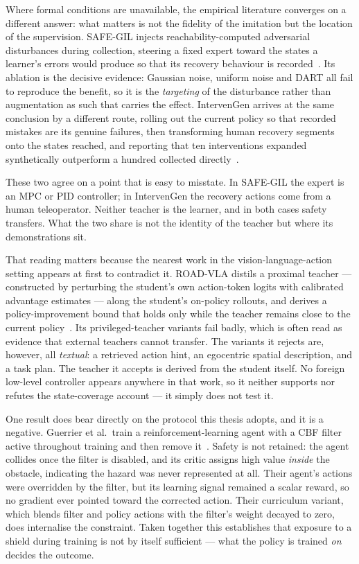 \documentclass[a4paper,11pt]{report}
\begin{document}
Where formal conditions are unavailable, the empirical literature converges on a different answer:
what matters is not the fidelity of the imitation but the location of the supervision. SAFE-GIL
injects reachability-computed adversarial disturbances during collection, steering a fixed expert
toward the states a learner's errors would produce so that its recovery behaviour is
recorded~\cite{ciftci2025safegil}. Its ablation is the decisive evidence: Gaussian noise, uniform
noise and DART all fail to reproduce the benefit, so it is the \emph{targeting} of the disturbance
rather than augmentation as such that carries the effect. IntervenGen arrives at the same
conclusion by a different route, rolling out the current policy so that recorded mistakes are its
genuine failures, then transforming human recovery segments onto the states reached, and reporting
that ten interventions expanded synthetically outperform a hundred collected
directly~\cite{hoque2024intervengen}.

These two agree on a point that is easy to misstate. In SAFE-GIL the expert is an MPC or PID
controller; in IntervenGen the recovery actions come from a human teleoperator. Neither teacher is
the learner, and in both cases safety transfers. What the two share is not the identity of the
teacher but where its demonstrations sit.

That reading matters because the nearest work in the vision-language-action setting appears at
first to contradict it. ROAD-VLA distils a proximal teacher --- constructed by perturbing the
student's own action-token logits with calibrated advantage estimates --- along the student's
on-policy rollouts, and derives a policy-improvement bound that holds only while the teacher
remains close to the current policy~\cite{wang2026roadvla}. Its privileged-teacher variants fail
badly, which is often read as evidence that external teachers cannot transfer. The variants it
rejects are, however, all \emph{textual}: a retrieved action hint, an egocentric spatial
description, and a task plan. The teacher it accepts is derived from the student itself. No foreign
low-level controller appears anywhere in that work, so it neither supports nor refutes the
state-coverage account --- it simply does not test it.

One result does bear directly on the protocol this thesis adopts, and it is a negative. Guerrier
et al.\ train a reinforcement-learning agent with a CBF filter active throughout training and then
remove it~\cite{guerrier2025guardrails}. Safety is not retained: the agent collides once the filter
is disabled, and its critic assigns high value \emph{inside} the obstacle, indicating the hazard was
never represented at all. Their agent's actions were overridden by the filter, but its learning
signal remained a scalar reward, so no gradient ever pointed toward the corrected action. Their
curriculum variant, which blends filter and policy actions with the filter's weight decayed to
zero, does internalise the constraint. Taken together this establishes that exposure to a shield
during training is not by itself sufficient --- what the policy is trained \emph{on} decides the
outcome.
\end{document}
